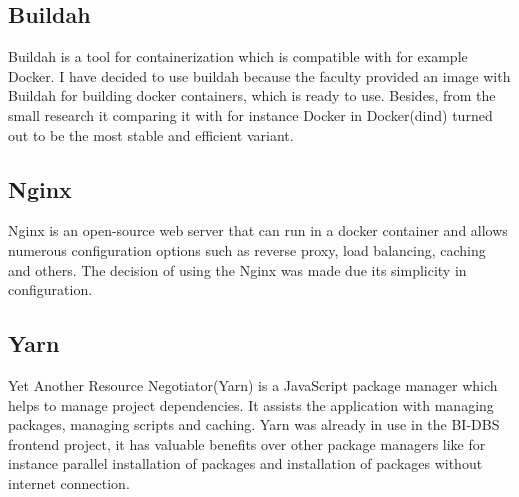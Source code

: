 \subsection{Buildah} Buildah is a tool for containerization which is compatible with for example Docker. I have decided to use buildah because the faculty provided an image with Buildah for building docker containers, which is ready to use. Besides, from the small research it comparing it with for instance Docker in Docker(dind) turned out to be the most stable and efficient variant.

\subsection{Nginx} Nginx is an open-source web server that can run in a docker container and allows numerous configuration options such as reverse proxy, load balancing, caching and others. The decision of using the Nginx was made due its simplicity in configuration.

\subsection{Yarn} Yet Another Resource Negotiator(Yarn) is a JavaScript package manager which helps to manage project dependencies. It assists the application with managing packages, managing scripts and caching. Yarn was already in use in the BI-DBS frontend project, it has valuable benefits over other package managers like for instance parallel installation of packages and installation of packages without internet connection.
